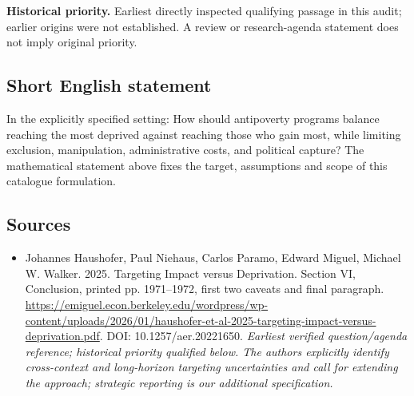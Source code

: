 \documentclass[11pt]{article}
\begin{document}
\par\textbf{Historical priority.} Earliest directly inspected qualifying passage in this audit; earlier origins were not established. A review or research-agenda statement does not imply original priority.

\subsection{Short English statement}
In the explicitly specified setting: How should antipoverty programs balance reaching the most deprived against reaching those who gain most, while limiting exclusion, manipulation, administrative costs, and political capture? The mathematical statement above fixes the target, assumptions and scope of this catalogue formulation.

\subsection{Sources}
\begin{itemize}\raggedright
\item[\textnormal{[S1]}]\hypertarget{source:30007656:1}{} Johannes Haushofer, Paul Niehaus, Carlos Paramo, Edward Miguel, Michael W. Walker. 2025. Targeting Impact versus Deprivation. Section VI, Conclusion, printed pp. 1971–1972, first two caveats and final paragraph.
\url{https://emiguel.econ.berkeley.edu/wordpress/wp-content/uploads/2026/01/haushofer-et-al-2025-targeting-impact-versus-deprivation.pdf}.
DOI: 10.1257/aer.20221650.
{\small\textit{Earliest verified question/agenda reference; historical priority qualified below. The authors explicitly identify cross-context and long-horizon targeting uncertainties and call for extending the approach; strategic reporting is our additional specification.}}
\end{itemize}
\end{document}
